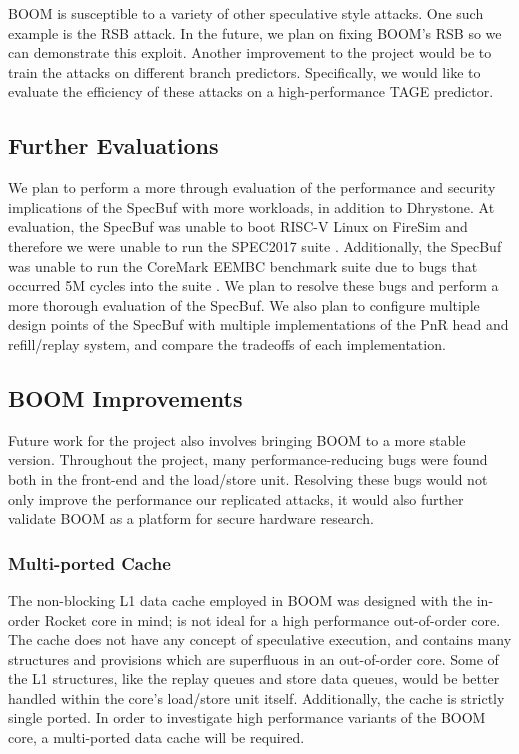 BOOM is susceptible to a variety of other speculative style attacks. One such example is the RSB
attack. In the future, we plan on fixing BOOM's RSB so we can demonstrate this exploit.
Another improvement to the project would be to train the attacks on different branch predictors.
Specifically, we would like to evaluate the efficiency of these attacks on a high-performance
TAGE predictor.

\subsection{Further Evaluations}

We plan to perform a more through evaluation of the performance and security implications of the
SpecBuf with more workloads, in addition to Dhrystone. At evaluation, the SpecBuf was unable to boot
RISC-V Linux on FireSim and therefore we were unable to run the SPEC2017 suite \cite{b50}.
Additionally, the SpecBuf was unable to run the CoreMark EEMBC benchmark suite due to bugs that
occurred 5M cycles into the suite \cite{b51}. We plan to resolve these bugs and perform a more
thorough evaluation of the SpecBuf. We also plan to configure multiple design
points of the SpecBuf with multiple implementations of the PnR head and refill/replay system, and compare the tradeoffs of each implementation.


\subsection{BOOM Improvements}

Future work for the project also involves bringing BOOM to a more stable version. Throughout
the project, many performance-reducing bugs were found both in the front-end and the 
load/store unit. Resolving these bugs would not only improve the performance our replicated attacks,
it would also further validate BOOM as a platform for secure hardware research.

\subsubsection{Multi-ported Cache}

The non-blocking L1 data cache employed in BOOM was designed with the in-order Rocket core in mind;
is not ideal for a high performance out-of-order core. The cache does not have any concept of
speculative execution, and contains many structures and provisions which are superfluous in an
out-of-order core. Some of the L1 structures, like the replay queues and store data queues, would be
better handled within the core's load/store unit itself.
Additionally, the cache is strictly single ported. In order to investigate high performance variants
of the BOOM core, a multi-ported data cache will be required.

